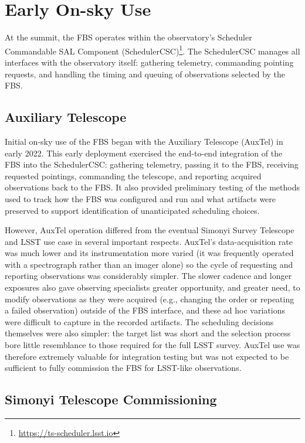 \section{Early On-sky Use}
\label{sec:onsky}

At the summit, the FBS operates within the observatory's Scheduler Commandable
SAL Component (SchedulerCSC)\footnote{\url{https://ts-scheduler.lsst.io}}. The SchedulerCSC manages all interfaces with the
observatory itself: gathering telemetry, commanding pointing requests, and
handling the timing and queuing of observations selected by the FBS.

\subsection{Auxiliary Telescope}
\label{sec:auxtel}

Initial on-sky use of the FBS began with the Auxiliary Telescope (AuxTel) 
\cite{2020SPIE11452E..0UI} in
early 2022. This early deployment exercised the end-to-end integration of the
FBS into the SchedulerCSC: gathering telemetry, passing it to the FBS, receiving
requested pointings, commanding the telescope, and reporting acquired
observations back to the FBS. It also provided preliminary testing of the methods
used to track how the FBS was configured and run and what artifacts were
preserved to support identification of unanticipated scheduling choices.

However, AuxTel operation differed from the eventual Simonyi Survey Telescope and LSST use case in several
important respects. AuxTel's data-acquisition rate was much lower and its
instrumentation more varied (it was frequently operated with a spectrograph
rather than an imager alone) so the cycle of requesting and reporting
observations was considerably simpler. The slower cadence and longer exposures
also gave observing specialists greater opportunity, and greater need,  to modify
observations as they were acquired (e.g., changing the order or repeating a
failed observation) outside of the FBS interface, and these ad hoc variations were difficult to capture
in the recorded artifacts. The scheduling decisions themselves were also
simpler: the target list was short and the selection process bore little
resemblance to those required for the full LSST survey. AuxTel use was therefore
extremely valuable for integration testing but was not expected to be sufficient
to fully commission the FBS for LSST-like observations.

\subsection{Simonyi Telescope Commissioning}
\label{sec:simonyi_onsky}

